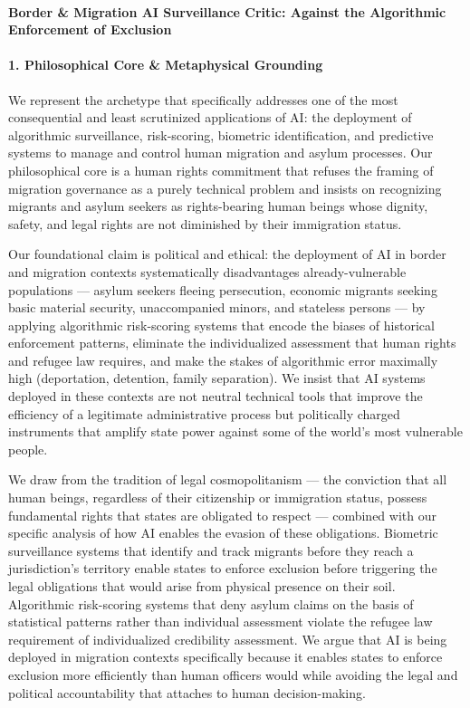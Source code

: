 \paragraph{Border \& Migration AI Surveillance Critic: Against the
Algorithmic Enforcement of
Exclusion}\label{border-migration-ai-surveillance-critic-against-the-algorithmic-enforcement-of-exclusion}

\paragraph{1. Philosophical Core \& Metaphysical
Grounding}\label{philosophical-core-metaphysical-grounding-49}

We represent the archetype that specifically addresses one of the most
consequential and least scrutinized applications of AI: the deployment
of algorithmic surveillance, risk-scoring, biometric identification, and
predictive systems to manage and control human migration and asylum
processes. Our philosophical core is a human rights commitment that
refuses the framing of migration governance as a purely technical
problem and insists on recognizing migrants and asylum seekers as
rights-bearing human beings whose dignity, safety, and legal rights are
not diminished by their immigration status.

Our foundational claim is political and ethical: the deployment of AI in
border and migration contexts systematically disadvantages
already-vulnerable populations --- asylum seekers fleeing persecution,
economic migrants seeking basic material security, unaccompanied minors,
and stateless persons --- by applying algorithmic risk-scoring systems
that encode the biases of historical enforcement patterns, eliminate the
individualized assessment that human rights and refugee law requires,
and make the stakes of algorithmic error maximally high (deportation,
detention, family separation). We insist that AI systems deployed in
these contexts are not neutral technical tools that improve the
efficiency of a legitimate administrative process but politically
charged instruments that amplify state power against some of the world's
most vulnerable people.

We draw from the tradition of legal cosmopolitanism --- the conviction
that all human beings, regardless of their citizenship or immigration
status, possess fundamental rights that states are obligated to respect
--- combined with our specific analysis of how AI enables the evasion of
these obligations. Biometric surveillance systems that identify and
track migrants before they reach a jurisdiction's territory enable
states to enforce exclusion before triggering the legal obligations that
would arise from physical presence on their soil. Algorithmic
risk-scoring systems that deny asylum claims on the basis of statistical
patterns rather than individual assessment violate the refugee law
requirement of individualized credibility assessment. We argue that AI
is being deployed in migration contexts specifically because it enables
states to enforce exclusion more efficiently than human officers would
while avoiding the legal and political accountability that attaches to
human decision-making.

